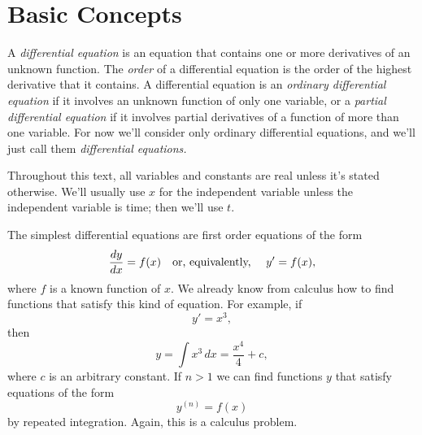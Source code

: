 \section{Basic Concepts}

\noindent
A {\color{blue}\it differential equation} is an equation that contains one or more derivatives of an
unknown function. The {\color{blue}\it order\/} of a differential equation is the order of the
highest derivative that it contains. A differential equation is an {\color{blue}\it ordinary
differential equation\/} if it involves an unknown function of only one variable, or a
{\color{blue}\it partial differential equation\/} if it involves partial derivatives of a function
of more than one variable. For now we'll consider only ordinary differential equations, and we'll
just call them {\color{blue}\it differential equations.\/}

Throughout this text, all variables and constants are real unless it's stated otherwise. We'll
usually use $x$ for the independent variable unless the independent variable is time; then we'll use
$t$.

The simplest differential equations are first order equations of the form
\[
  \frac{dy}{dx}=f(x)\mbox{\quad or, equivalently, \quad}y'=f(x),
\]
where $f$ is a known function of $x$. We already know from calculus how to find functions that
satisfy this kind of equation. For example, if
\[
  y'=x^{3},
\]
then
\[
  y=\int x^{3}\,dx=\frac{x^{4}}{4}+c,
\]
where $c$ is an arbitrary constant. If $n>1$ we can find functions $y$ that satisfy equations of the
form
\begin{equation}
  \label{eq:1.2.1}y^{(n)}=f(x)
\end{equation}
by repeated integration. Again, this is a calculus problem.

